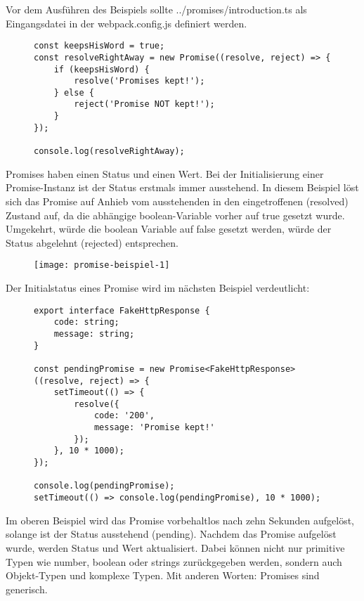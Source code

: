 \noindent
Vor dem Ausführen des Beispiels sollte ../promises/introduction.ts als Eingangsdatei in der webpack.config.js definiert werden.

\begin{figure}[H]
\begin{lstlisting}[basicstyle=\small]
const keepsHisWord = true;
const resolveRightAway = new Promise((resolve, reject) => {
    if (keepsHisWord) {
        resolve('Promises kept!');
    } else {
        reject('Promise NOT kept!');
    }
});

console.log(resolveRightAway);
\end{lstlisting}
\end{figure}

\noindent
Promises haben einen Status und einen Wert. Bei der Initialisierung einer Promise-Instanz ist der Status erstmals immer ausstehend. In diesem Beispiel löst sich das Promise auf Anhieb vom ausstehenden in den eingetroffenen (resolved) Zustand auf, da die abhängige boolean-Variable vorher auf true gesetzt wurde. Umgekehrt, würde die boolean Variable auf false gesetzt werden, würde der Status abgelehnt (rejected) entsprechen.

\begin{figure}[H]
\centering
\texttt{[image: promise-beispiel-1]}
\end{figure}

\noindent
Der Initialstatus eines Promise wird im nächsten Beispiel verdeutlicht:

\begin{figure}[H]
\begin{lstlisting}[basicstyle=\small]
export interface FakeHttpResponse {
    code: string;
    message: string;
}

const pendingPromise = new Promise<FakeHttpResponse>((resolve, reject) => {
    setTimeout(() => {
        resolve({
            code: '200',
            message: 'Promise kept!'
        });
    }, 10 * 1000);
});

console.log(pendingPromise);
setTimeout(() => console.log(pendingPromise), 10 * 1000);
\end{lstlisting}
\end{figure}

\noindent
Im oberen Beispiel wird das Promise vorbehaltlos nach zehn Sekunden aufgelöst, solange ist der Status ausstehend (pending). Nachdem das Promise aufgelöst wurde, werden Status und Wert aktualisiert. Dabei können nicht nur primitive Typen wie number, boolean oder strings zurückgegeben werden, sondern auch Objekt-Typen und komplexe Typen. Mit anderen Worten: Promises sind generisch.

